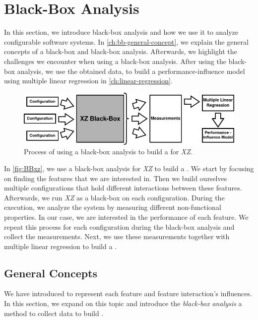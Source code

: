 \section{Black-Box Analysis}\label{ch:Blackbox}
In this section, we introduce black-box analysis and how we use it to analyze configurable software systems. 
In \autoref{ch:bb-general-concept}, we explain the general concepts of a black-box and black-box analysis. 
Afterwards, we highlight the challenges we encounter when using a black-box analysis.
After using the black-box analysis, we use the obtained data, to build a performance-influence model using multiple linear regression in \autoref{ch:linear-regression}.

\begin{figure}[h]
    \centering
    \includegraphics[scale=0.53]{gfx/BlackBox2_0.png}
    \caption{Process of using a black-box analysis to build a {\perfInfluenceModel} for \textit{XZ}.}
    \label{fig:BBxz}
\end{figure}

In \autoref{fig:BBxz}, we use a black-box analysis for \textit{XZ} to build a \perfInfluenceModel.
We start by focusing on finding the features that we are interested in. 
Then we build ourselves multiple configurations that hold different interactions between these features.
Afterwards, we run \textit{XZ} as a black-box on each configuration. During the execution, we analyze the system by measuring different non-functional properties.
In our case, we are interested in the performance of each feature. 
We repeat this process for each configuration during the black-box analysis and collect the measurements.
Next, we use these measurements together with multiple linear regression to build a \perfInfluenceModel.

\subsection{General Concepts}\label{ch:bb-general-concept}

We have introduced {\perfInfluenceModel} to represent each feature and feature interaction's influences. 
In this section, we expand on this topic and introduce the \emph{black-box analysis} a method to collect data to build \perfInfluenceModel.

